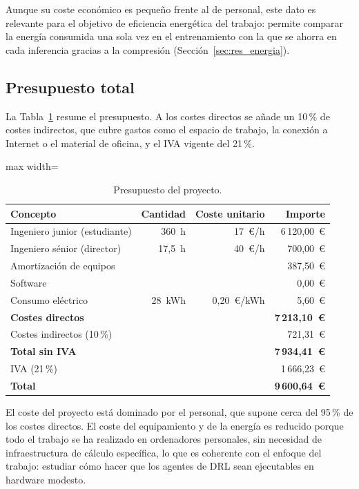 Aunque su coste económico es pequeño frente al de personal, este dato es relevante para el objetivo de eficiencia energética del trabajo: permite comparar la energía consumida una sola vez en el entrenamiento con la que se ahorra en cada inferencia gracias a la compresión (Sección~\ref{sec:res_energia}).

\subsection{Presupuesto total}\label{sec:presupuesto}

La Tabla~\ref{tab:presupuesto} resume el presupuesto. A los costes directos se añade un 10\,\% de costes indirectos, que cubre gastos como el espacio de trabajo, la conexión a Internet o el material de oficina, y el IVA vigente del 21\,\%.

\begin{table}[H]
	\centering
	\small
	\begin{adjustbox}{max width=\textwidth}
	\begin{tabular}{lrrr}
		\toprule
		\textbf{Concepto} & \textbf{Cantidad} & \textbf{Coste unitario} & \textbf{Importe} \\
		\midrule
		Ingeniero junior (estudiante) & 360~h & 17~€/h & 6\,120,00~€ \\
		Ingeniero sénior (director) & 17,5~h & 40~€/h & 700,00~€ \\
		Amortización de equipos & & & 387,50~€ \\
		Software & & & 0,00~€ \\
		Consumo eléctrico & 28~kWh & 0,20~€/kWh & 5,60~€ \\
		\midrule
		\textbf{Costes directos} & & & \textbf{7\,213,10~€} \\
		Costes indirectos (10\,\%) & & & 721,31~€ \\
		\midrule
		\textbf{Total sin IVA} & & & \textbf{7\,934,41~€} \\
		IVA (21\,\%) & & & 1\,666,23~€ \\
		\midrule
		\textbf{Total} & & & \textbf{9\,600,64~€} \\
		\bottomrule
	\end{tabular}
	\end{adjustbox}
	\caption{Presupuesto del proyecto.}
	\label{tab:presupuesto}
\end{table}


El coste del proyecto está dominado por el personal, que supone cerca del 95\,\% de los costes directos. El coste del equipamiento y de la energía es reducido porque todo el trabajo se ha realizado en ordenadores personales, sin necesidad de infraestructura de cálculo específica, lo que es coherente con el enfoque del trabajo: estudiar cómo hacer que los agentes de DRL sean ejecutables en hardware modesto.
